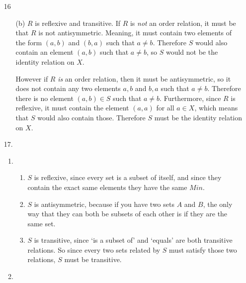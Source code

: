 \documentclass[fleqn]{article}
\begin{document}
\begin{enumerate}
	\item[16]
	\begin{enumerate}
		\item[(b)]
		\(R\) is reflexive and transitive. If \(R\) is \textit{not} an order relation, it must be that \(R\) is not antisymmetric. Meaning, it must contain two elements of the form \((a, b)\) and \((b, a)\) such that \(a \neq b\). Therefore \(S\) would also contain an element \((a, b)\) such that \(a \neq b\), so \(S\) would not be the identity relation on \(X\).

		However if \(R\) \textit{is} an order relation, then it must be antisymmetric, so it does not contain any two elements \(a, b\) and \(b, a\) such that \(a \neq b\). Therefore there is no element \((a, b) \in S\) such that \(a \neq b\). Furthermore, since \(R\) is reflexive, it must contain the element \((a, a)\) for all \(a \in X\), which means that \(S\) would also contain those. Therefore \(S\) must be the identity relation on \(X\).
	\end{enumerate}

	\item[17.]
	\begin{enumerate}
		\item %
		\begin{enumerate}
			\item %
			\(S\) is reflexive, since every set is a subset of itself, and since they contain the exact same elements they have the same \(Min\).

			\item %
			\(S\) is antisymmetric, because if you have two sets \(A\) and \(B\), the only way that they can both be subsets of each other is if they are the same set.

			\item %
			\(S\) is transitive, since `is a subset of' and `equals' are both transitive relations. So since every two sets related by \(S\) must satisfy those two relations, \(S\) must be transitive.
		\end{enumerate}

		\item{}
\end{enumerate}
\end{enumerate}
\end{document}

